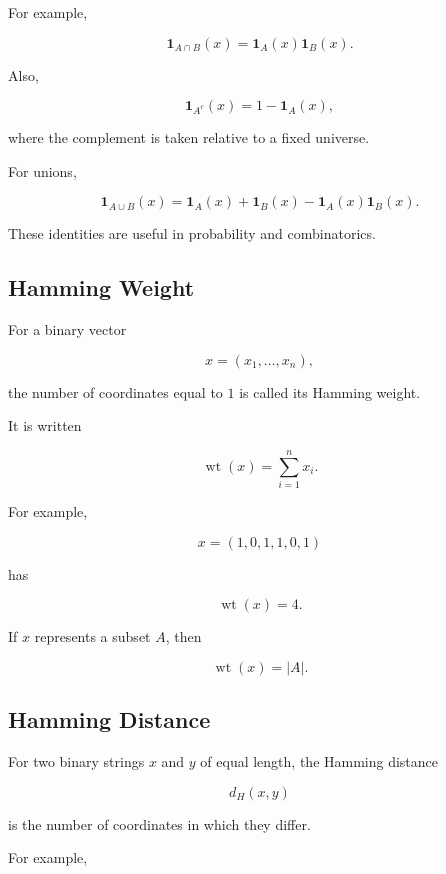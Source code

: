 For example,

\[
\boxed{
\mathbf{1}_{A\cap B}(x)
=
\mathbf{1}_A(x)\mathbf{1}_B(x).
}
\]

Also,

\[
\boxed{
\mathbf{1}_{A^c}(x)
=
1-\mathbf{1}_A(x),
}
\]

where the complement is taken relative to a fixed universe.

For unions,

\[
\boxed{
\mathbf{1}_{A\cup B}(x)
=
\mathbf{1}_A(x)
+
\mathbf{1}_B(x)
-
\mathbf{1}_A(x)\mathbf{1}_B(x).
}
\]

These identities are useful in probability and combinatorics.

\subsection{Hamming Weight}
\label{subsec:hamming-weight}

For a binary vector

\[
x=(x_1,\ldots,x_n),
\]

the number of coordinates equal to \(1\) is called its Hamming weight.

It is written

\[
\boxed{
\operatorname{wt}(x)
=
\sum_{i=1}^{n}x_i.
}
\]

For example,

\[
x=(1,0,1,1,0,1)
\]

has

\[
\operatorname{wt}(x)=4.
\]

If \(x\) represents a subset \(A\), then

\[
\boxed{
\operatorname{wt}(x)=|A|.
}
\]

\subsection{Hamming Distance}
\label{subsec:hamming-distance}

For two binary strings \(x\) and \(y\) of equal length, the Hamming
distance

\[
d_H(x,y)
\]

is the number of coordinates in which they differ.

For example,


